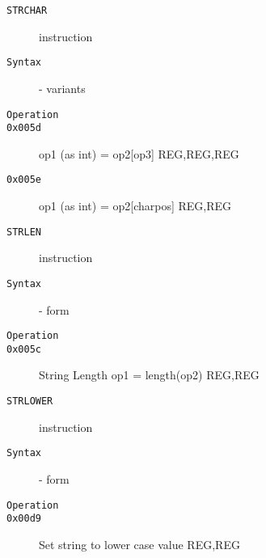 \clearpage
\begin{description}
\item[\texttt{STRCHAR}] instruction\\
\item[\texttt{Syntax}] - variants\\

\item[\texttt{Operation}]
\item[\texttt{}]
\item[\texttt{0x005d}] op1 (as int) = op2[op3]  {REG,REG,REG}       \\
\item[\texttt{0x005e}] op1 (as int) = op2[charpos]  {REG,REG}           \\
\end{description}
\clearpage
\begin{description}
\item[\texttt{STRLEN}] instruction\\
\item[\texttt{Syntax}] - form \\

\item[\texttt{Operation}]
\item[\texttt{}]
\item[\texttt{0x005c}] String Length op1 = length(op2)  {REG,REG}           \\
\end{description}
\clearpage
\begin{description}
\item[\texttt{STRLOWER}] instruction\\
\item[\texttt{Syntax}] - form \\

\item[\texttt{Operation}]
\item[\texttt{}]
\item[\texttt{0x00d9}] Set string to lower case value  {REG,REG}           \\
\end{description}
